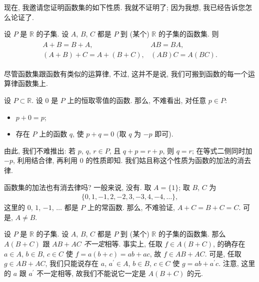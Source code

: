 现在, 我邀请您证明函数集的如下性质.
我就不证明了;
因为我想, 我已经告诉您怎么论证了.

\begin{theorem}
    设 $P$ 是 $\mathbb{R}$ 的子集.
    设 $A$, $B$, $C$ 都是 $P$ 到
    (某个) $\mathbb{R}$ 的子集的函数集.
    则
    \begin{align*}
        \begin{array}{ll}
            A + B = B + A,             & AB = BA,       \\
            (A + B) + C = A + (B + C), & (AB)C = A(BC).
        \end{array}
    \end{align*}
\end{theorem}

尽管函数集跟函数有类似的运算律,
不过, 这并不是说,
我们可搬到函数的每一个运算律函数集上.

\begin{example}
    设 $P \subset \mathbb{R}$.
    设 $0$ 是 $P$ 上的恒取零值的函数.
    那么, 不难看出, 对任意 $p \in P$:
    \begin{itemize}
        \item $p + 0 = p$;
        \item 存在 $P$ 上的函数 $q$, 使 $p + q = 0$
              (取 $q$ 为 $-p$ 即可).
    \end{itemize}
    由此, 我们不难推出:
    若 $p$, $q$, $r \in P$, 且 $q + p = r + p$, 则 $q = r$;
    在等式二侧同时加 $-p$, 利用结合律, 再利用 $0$ 的性质即知.
    我们姑且称这个性质为函数的加法的消去律.

    函数集的加法也有消去律吗?
    一般来说, 没有.
    取 $A = \{ 1 \}$;
    取 $B$, $C$ 为
    \begin{align*}
        \{ 0, 1, -1, 2, -2, 3, -3, 4, -4, \dots \},
    \end{align*}
    这里的 $0$, $1$, $-1$, $\dots$ 都是 $P$ 上的常函数.
    那么, 不难验证, $A + C = B + C = C$.
    可是, $A \neq B$.
\end{example}

\begin{example}
    设 $P$ 是 $\mathbb{R}$ 的子集.
    设 $A$, $B$, $C$ 都是 $P$ 到
    (某个) $\mathbb{R}$ 的子集的函数集.
    那么 $A(B + C)$ 跟 $AB + AC$ \emph{不一定}相等.
    事实上, 任取 $f \in A(B + C)$,
    的确存在 $a \in A$, $b \in B$, $c \in C$
    使 $f = a(b + c) = ab + ac$,
    故 $f \in AB + AC$.
    可是, 任取 $g \in AB + AC$,
    我们只能说存在
    $a$, $a^{\prime} \in A$, $b \in B$, $c \in C$
    使 $g = ab + a^{\prime}c$.
    注意, 这里的 $a$ 跟 $a^{\prime}$ 不一定相等,
    故我们不能说它一定是 $A(B + C)$ 的元.
\end{example}

